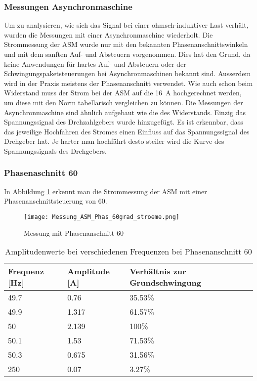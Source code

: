 \newpage
\subsubsection{Messungen Asynchronmaschine}
Um zu analysieren, wie sich das Signal bei einer ohmsch-induktiver Last verhält, wurden die Messungen mit einer Asynchronmaschine wiederholt. Die Strommessung der ASM wurde nur mit den bekannten Phasenanschnittswinkeln und mit dem sanften Auf- und Absteuern vorgenommen. Dies hat den Grund, da keine Anwendungen für hartes Auf- und Absteuern oder der Schwingungspaketsteuerungen bei Asynchronmaschinen bekannt sind. Ausserdem wird in der Praxis meistens der Phasenanschnitt verwendet. Wie auch schon beim Widerstand muss der Strom bei der ASM auf die \SI{16}{A} hochgerechnet werden, um diese mit den Norm tabellarisch vergleichen zu können. Die Messungen der Asynchronmaschine sind ähnlich aufgebaut wie die des Widerstands. Einzig das Spannungssignal des Drehzahlgebers wurde hinzugefügt. Es ist erkennbar, dass das jeweilige Hochfahren des Stromes einen Einfluss auf das Spannungssignal des Drehgeber hat. Je harter man hochfährt desto steiler wird die Kurve des Spannungssignals des Drehgebers. 


\subsubsection*{Phasenaschnitt 60\textdegree}
In Abbildung \ref{fig:Mess_Phas_60grad_stroeme} erkennt man die Strommessung der ASM mit einer Phasenanschnittsteuerung von 60\textdegree\hspace{0.02cm}.

\begin{figure}[ht!]
	\centering
	\texttt{[image: Messung\_ASM\_Phas\_60grad\_stroeme.png]}	
	\caption{Messung mit Phasenanschnitt 60\textdegree}\label{fig:Mess_Phas_60grad_stroeme}
\end{figure}

\begin{table}[ht!]
	\centering
	\begin{tabular}{|l|l|l|}
		\hline
		Frequenz {[}Hz{]} & Amplitude {[}A{]} & Verhältnis zur Grundschwingung	\\ \hline
		49.7              & 0.76              & 35.53\%							\\ \hline
		49.9              & 1.317             & 61.57\%							\\ \hline
		50                & 2.139             & 100\%							\\ \hline
		50.1              & 1.53              & 71.53\%							\\ \hline
		50.3              & 0.675             & 31.56\%							\\ \hline
		250               & 0.07              & 3.27\%							\\ \hline
	\end{tabular}
	\caption{Amplitudenwerte bei verschiedenen Frequenzen bei Phasenanschnitt 60\textdegree}\label{tab:Phas_60_ASM_stroeme}
\end{table}


